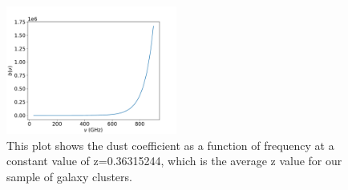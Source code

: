 \documentclass{princeton_astro_thesis}
\begin{document}
\begin{figure}[h]
\centering
\includegraphics[width=0.5\textwidth]{../bdust.pdf}
\caption{This plot shows the dust coefficient as a function of frequency at a constant value of z=0.36315244, which is the average z value for our sample of galaxy clusters.}
\end{figure}
\end{document}
